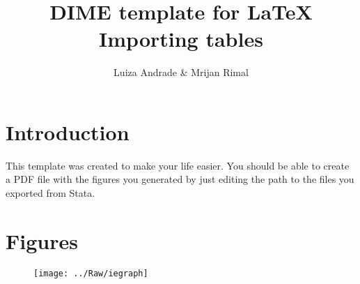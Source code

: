 \documentclass{article}                 %
\title{DIME template for \LaTeX \\ Importing tables} 	%
\author{Luiza Andrade \& Mrijan Rimal}
\begin{document}

    \maketitle
    \tableofcontents        %
    \listoffigures			%

    \newpage    
    \section{Introduction} %
    
        This template was created to make your life easier. You should be able to create a PDF file with the figures you generated by just editing the path to the files you exported from Stata.
     
    \section{Figures}
           	   
		\begin{figure}[H]
			\texttt{[image: ../Raw/iegraph]}
		\end{figure}
           
  
\end{document}
